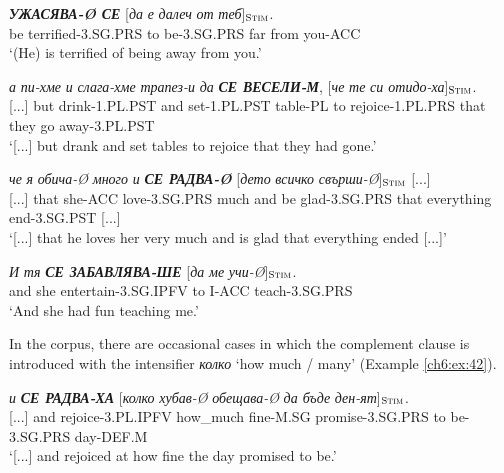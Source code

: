 \documentclass[output=paper,colorlinks,citecolor=brown]{langscibook}
\begin{document}
\begin{exe} 
\ex  \label{ch6:ex:38} 
\gll \textit{\textbf{УЖАСЯВА-Ø СЕ}} [{\textit{да}} {\textit{е}} {\textit{далеч}} {\textit{от}} {\textit{теб}}]$_{\text{\textsc{Stim}}}$. \\ 
{be terrified-3.SG.PRS} {to} {be-3.SG.PRS} {far} {from} {you-ACC}
\\ %
\glt `(He) is terrified of being away from you.'

\ex \label{ch6:ex:39} 
\gll [...] \textit{а} \textit{пи-хме} \textit{и} \textit{слага-хме} \textit{трапез-и} \textit{да} \textit{\textbf{СЕ ВЕСЕЛИ-М}}, [\textit{че} \textit{те} \textit{си отидо-ха}]$_{\text{\textsc{Stim}}}$. \\ 
{}[...] {but} {drink-1.PL.PST} {and} {set-1.PL.PST} {table-PL} {to} {rejoice-1.PL.PRS} {that} {they} {go away-3.PL.PST}
\\  %
\glt `[...] but drank and set tables to rejoice that they had gone.'

\ex   \label{ch6:ex:40}
\gll [...] \textit{че} \textit{я} \textit{обича-Ø} \textit{много} \textit{и} \textit{\textbf{СЕ РАДВА-Ø}}  [\textit{дето} \textit{всичко} \textit{свърши-Ø}]$_{\text{\textsc{Stim}}}$ [...] \\ 
{}[...] {that} {she-ACC} {love-3.SG.PRS} {much} {and} {be glad-3.SG.PRS} {that} {everything} {end-3.SG.PST} [...]
\\ %
\glt `[...] that he loves her very much and is glad that everything ended [...]'

\ex  \label{ch6:ex:41}  
\gll \textit{И} \textit{тя} \textit{\textbf{СЕ ЗАБАВЛЯВА-ШЕ}}  [\textit{да} \textit{ме} \textit{учи-Ø}]$_{\text{\textsc{Stim}}}$. \\ 
{and} {she} {entertain-3.SG.IPFV} {to} {I-ACC} {teach-3.SG.PRS}
\\  %
\glt `And she had fun teaching me.'
\end{exe}

In the corpus, there are occasional cases in which the complement clause is introduced with the intensifier \textit{колко} `how much / many' (Example \ref{ch6:ex:42}).

\begin{exe}
\ex   \label{ch6:ex:42} 
\gll [...] \textit{и} \textit{\textbf{СЕ РАДВА-ХА}}  [\textit{колко} \textit{хубав-Ø} \textit{обещава-Ø} \textit{да бъде} \textit{ден-ят}]$_{\text{\textsc{Stim}}}$. \\ 
{}[...] {and} {rejoice-3.PL.IPFV} {how\_much} {fine-M.SG} {promise-3.SG.PRS} {to be-3.SG.PRS} {day-DEF.M}
\\ %
\glt `[...] and rejoiced at how fine the day promised to be.'
\end{exe}
\end{document}
